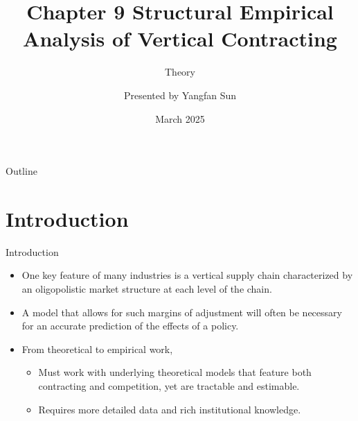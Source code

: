 \documentclass[aspectratio=169]{beamer}  %
\title{Chapter 9 Structural Empirical Analysis of Vertical Contracting}
\subtitle{Theory}
\author{Presented by Yangfan Sun}
\institute{Hong Kong University of Science and Technology}
\date{March 2025}
\begin{document}
\begin{frame}[plain]
    \titlepage
\end{frame}

\begin{frame}{Outline}
    \tableofcontents
\end{frame}

\section{Introduction}
\begin{frame}{Introduction}
    \begin{itemize}
        \item One key feature of many industries is a vertical supply chain characterized by an oligopolistic market structure at each level of the chain. \vspace{.2cm}
        \item A model that allows for such margins of adjustment will often be necessary for an accurate prediction of the effects of a policy. \vspace{.2cm}
        \item From theoretical to empirical work, \vspace{.2cm}
        \begin{itemize}
            \item Must work with underlying theoretical models that feature both contracting and competition, yet are tractable and estimable.\vspace{.2cm}
            \item Requires more detailed data and rich institutional knowledge. \vspace{.2cm}
        \end{itemize}
    \end{itemize}
\end{frame}



\end{document}
